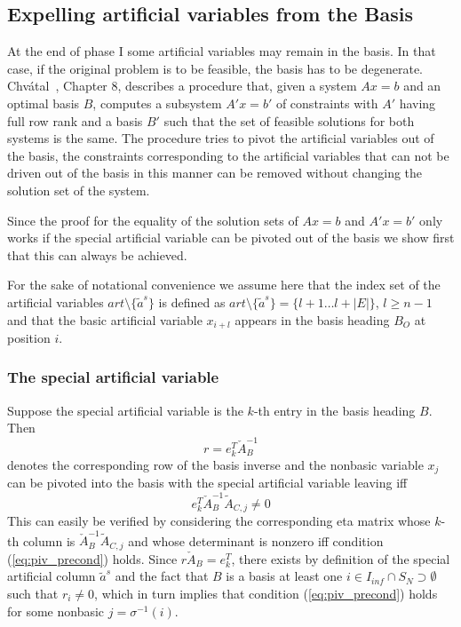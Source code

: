 \documentclass[a4paper]{article}
\begin{document}
\subsection{Expelling artificial variables from the Basis}
At the end of phase I some artificial variables may remain in the basis.
In that case, if the original problem is to be feasible, the basis has to be
degenerate.
Chv\'{a}tal~\cite{Chvatal}, Chapter 8, describes a procedure that,
given a system $Ax = b$ and an optimal
basis $B$, computes a subsystem $A'x = b'$ of constraints with $A'$ having full
row rank and a basis $B'$ such that the set of feasible solutions for both
systems is the same. The procedure tries to pivot the artificial variables out of
the basis, the constraints corresponding to the artificial variables that can
not be driven out of the basis in this manner can be removed without changing
the solution set of the system.

Since the proof for the equality of the solution sets of $Ax = b$ and
$A'x = b'$ only works if the special artificial variable can be pivoted out of
the basis we show first that this can always be achieved.

For the sake of notational convenience we assume here that the index set of the
artificial variables $art\setminus \{\tilde{a}^{s}\}$ is defined as
$art\setminus \{\tilde{a}^{s}\}=\{l+1 \ldots l+\left|E\right| \}$,
$l \geq n-1$ and that the basic artificial variable $x_{i+l}$ appears in the
basis heading $B_{O}$ at position $i$.
 
\subsubsection{The special artificial variable}
\label{sec:spec_art_unpert}
Suppose the special artificial variable is the $k$-th entry in the basis
heading $B$. Then 
\[ 
  r = e_{k}^{T} \check{A}_{B}^{-1}
\]
denotes the corresponding row of the basis inverse and
the nonbasic variable $x_{j}$ can be pivoted into the basis
with the special artificial variable leaving iff 
\begin{equation} \label{eq:piv_precond}
e_{k}^{T}\check{A}_{B}^{-1}\tilde{A}_{C,j} \neq 0
\end{equation}
This can easily be verified by considering the corresponding eta matrix
whose $k$-th column is $\check{A}_{B}^{-1}\tilde{A}_{C,j}$ and whose determinant
is nonzero iff condition (\ref{eq:piv_precond}) holds.
Since $r \check{A}_{B} = e_{k}^{T}$, there exists by definition of 
the special artificial column $\tilde{a}^{s}$ and the fact that $B$ is a basis
at least one
$i \in I_{inf} \cap S_{N} \supset \emptyset$ such that
$r_{i} \neq 0$, which in turn implies that condition
(\ref{eq:piv_precond}) holds for some nonbasic
$j = \sigma^{-1} \left( i \right)$.
\end{document}
